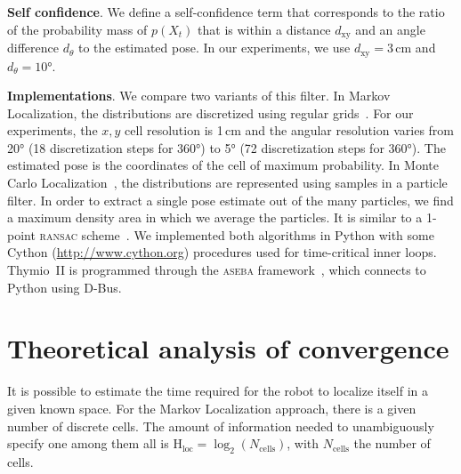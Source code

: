 \documentclass{svmult}
\newcommand{\ent}[1]{\mathrm{H}_\mathrm{#1}} %
\begin{document}

\textbf{Self confidence}. We define a self-confidence term that corresponds to the ratio of the probability mass of $p(X_t)$ that is within a distance $d_\mathrm{xy}$ and an angle difference $d_\theta$ to the estimated pose.
In our experiments, we use $d_\mathrm{xy} = 3$\,cm and $d_\theta = 10$°.


\textbf{Implementations}.
We compare two variants of this filter.
In Markov Localization, the distributions are discretized using regular grids~\cite{fox1999markov}.
For our experiments, the $x,y$ cell resolution is 1\,cm and the angular resolution varies from 20° (18 discretization steps for 360°) to 5° (72 discretization steps for 360°).
The estimated pose is the coordinates of the cell of maximum probability.
In Monte Carlo Localization~\cite{dellaert1999monte}, the distributions are represented using samples in a particle filter.
In order to extract a single pose estimate out of the many particles, we find a maximum density area in which we average the particles.
It is similar to a 1-point \textsc{ransac} scheme~\cite{Fischler1981ransac}.
We implemented both algorithms in Python with some Cython (\url{http://www.cython.org}) procedures used for time-critical inner loops.
Thymio~II is programmed through the \textsc{aseba} framework~\cite{aseba2011tmech}, which connects to Python using D-Bus.

\section{Theoretical analysis of convergence}
\label{sec:theoreticalconv}

It is possible to estimate the time required for the robot to localize itself in a given known space.
For the Markov Localization approach, there is a given number of discrete cells.
The amount of information needed to unambiguously specify one among them all is $\ent{loc} = \log_2(N_\mathrm{cells})$, with $N_\mathrm{cells}$ the number of cells.
\end{document}
